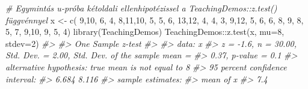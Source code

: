 \documentclass[
]{book}
\newenvironment{Shaded}{\begin{snugshade}}{\end{snugshade}}
\newcommand{\AttributeTok}[1]{\textcolor[rgb]{0.77,0.63,0.00}{#1}}
\newcommand{\CommentTok}[1]{\textcolor[rgb]{0.56,0.35,0.01}{\textit{#1}}}
\newcommand{\DecValTok}[1]{\textcolor[rgb]{0.00,0.00,0.81}{#1}}
\newcommand{\FunctionTok}[1]{\textcolor[rgb]{0.00,0.00,0.00}{#1}}
\newcommand{\NormalTok}[1]{#1}
\newcommand{\OtherTok}[1]{\textcolor[rgb]{0.56,0.35,0.01}{#1}}
\newcommand{\SpecialCharTok}[1]{\textcolor[rgb]{0.00,0.00,0.00}{#1}}
\begin{document}
\begin{Shaded}
\begin{Highlighting}[]
\CommentTok{\# Egymintás u{-}próba kétoldali ellenhipotézissel a TeachingDemos::z.test() függvénnyel}
\NormalTok{x }\OtherTok{\textless{}{-}} \FunctionTok{c}\NormalTok{( }\DecValTok{9}\NormalTok{,}\DecValTok{10}\NormalTok{, }\DecValTok{6}\NormalTok{, }\DecValTok{4}\NormalTok{, }\DecValTok{8}\NormalTok{,}\DecValTok{11}\NormalTok{,}\DecValTok{10}\NormalTok{, }\DecValTok{5}\NormalTok{, }\DecValTok{5}\NormalTok{, }\DecValTok{6}\NormalTok{,}
       \DecValTok{13}\NormalTok{,}\DecValTok{12}\NormalTok{, }\DecValTok{4}\NormalTok{, }\DecValTok{4}\NormalTok{, }\DecValTok{3}\NormalTok{, }\DecValTok{9}\NormalTok{,}\DecValTok{12}\NormalTok{, }\DecValTok{5}\NormalTok{, }\DecValTok{6}\NormalTok{, }\DecValTok{6}\NormalTok{,}
        \DecValTok{8}\NormalTok{, }\DecValTok{9}\NormalTok{, }\DecValTok{8}\NormalTok{, }\DecValTok{5}\NormalTok{, }\DecValTok{7}\NormalTok{, }\DecValTok{9}\NormalTok{,}\DecValTok{10}\NormalTok{, }\DecValTok{9}\NormalTok{, }\DecValTok{5}\NormalTok{, }\DecValTok{4}\NormalTok{)}
\FunctionTok{library}\NormalTok{(TeachingDemos)}
\NormalTok{TeachingDemos}\SpecialCharTok{::}\FunctionTok{z.test}\NormalTok{(x, }\AttributeTok{mu=}\DecValTok{8}\NormalTok{, }\AttributeTok{stdev=}\DecValTok{2}\NormalTok{)  }
\CommentTok{\#\textgreater{} }
\CommentTok{\#\textgreater{}  One Sample z{-}test}
\CommentTok{\#\textgreater{} }
\CommentTok{\#\textgreater{} data:  x}
\CommentTok{\#\textgreater{} z = {-}1.6, n = 30.00, Std. Dev. = 2.00, Std. Dev. of the sample mean =}
\CommentTok{\#\textgreater{} 0.37, p{-}value = 0.1}
\CommentTok{\#\textgreater{} alternative hypothesis: true mean is not equal to 8}
\CommentTok{\#\textgreater{} 95 percent confidence interval:}
\CommentTok{\#\textgreater{}  6.684 8.116}
\CommentTok{\#\textgreater{} sample estimates:}
\CommentTok{\#\textgreater{} mean of x }
\CommentTok{\#\textgreater{}       7.4}
\end{Highlighting}
\end{Shaded}
\end{document}
